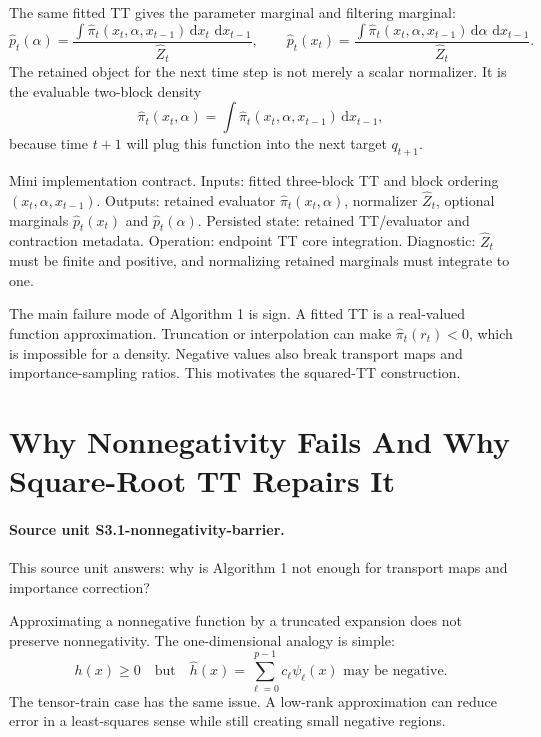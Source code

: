\documentclass[11pt]{article}
\newcommand{\dd}{\,\mathrm d}
\begin{document}
The same fitted TT gives the parameter marginal and filtering marginal:
\[
    \widehat p_t(\alpha)
    =
    \frac{\int\widehat\pi_t(x_t,\alpha,x_{t-1})
    \dd x_t\,\dd x_{t-1}}
    {\widehat Z_t},
    \qquad
    \widehat p_t(x_t)
    =
    \frac{\int\widehat\pi_t(x_t,\alpha,x_{t-1})
    \dd\alpha\,\dd x_{t-1}}
    {\widehat Z_t}.
    \tag{A1-6}
\]
The retained object for the next time step is not merely a scalar
normalizer.  It is the evaluable two-block density
\[
    \widehat\pi_t(x_t,\alpha)
    =
    \int\widehat\pi_t(x_t,\alpha,x_{t-1})\dd x_{t-1},
    \tag{A1-7}
\]
because time \(t+1\) will plug this function into the next target
\(q_{t+1}\).

Mini implementation contract.  Inputs: fitted three-block TT and block ordering
\((x_t,\alpha,x_{t-1})\).  Outputs: retained evaluator
\(\widehat\pi_t(x_t,\alpha)\), normalizer \(\widehat Z_t\), optional marginals
\(\widehat p_t(x_t)\) and \(\widehat p_t(\alpha)\).  Persisted state: retained
TT/evaluator and contraction metadata.  Operation: endpoint TT core
integration.  Diagnostic: \(\widehat Z_t\) must be finite and positive, and
normalizing retained marginals must integrate to one.

The main failure mode of Algorithm 1 is sign.  A fitted TT is a real-valued
function approximation.  Truncation or interpolation can make
\(\widehat\pi_t(r_t)<0\), which is impossible for a density.  Negative values
also break transport maps and importance-sampling ratios.  This motivates the
squared-TT construction.

\section{Why Nonnegativity Fails And Why Square-Root TT Repairs It}

\paragraph{Source unit S3.1-nonnegativity-barrier.}
This source unit answers: why is Algorithm 1 not enough for transport maps and
importance correction?

Approximating a nonnegative function by a truncated expansion does not preserve
nonnegativity.  The one-dimensional analogy is simple:
\[
    h(x)\ge 0
    \quad\text{but}\quad
    \widehat h(x)=\sum_{\ell=0}^{p-1}c_\ell\psi_\ell(x)
    \text{ may be negative.}
\]
The tensor-train case has the same issue.  A low-rank approximation can reduce
error in a least-squares sense while still creating small negative regions.
\end{document}
